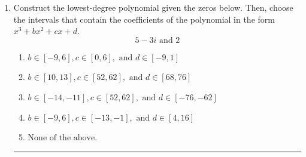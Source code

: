 \documentclass[14pt]{extbook}
\newcommand{\litem}[1]{\item#1\hspace*{-1cm}\rule{\textwidth}{0.4pt}}
\begin{document}
\begin{enumerate}
\litem{
Construct the lowest-degree polynomial given the zeros below. Then, choose the intervals that contain the coefficients of the polynomial in the form $x^3+bx^2+cx+d$.\[ 5 - 3 i \text{ and } 2 \]\begin{enumerate}[label=\Alph*.]
\item \( b \in [-9, 6], c \in [0, 6], \text{ and } d \in [-9, 1] \)
\item \( b \in [10, 13], c \in [52, 62], \text{ and } d \in [68, 76] \)
\item \( b \in [-14, -11], c \in [52, 62], \text{ and } d \in [-76, -62] \)
\item \( b \in [-9, 6], c \in [-13, -1], \text{ and } d \in [4, 16] \)
\item \( \text{None of the above.} \)


\end{enumerate}}
\end{enumerate}
\end{document}
